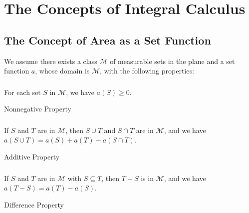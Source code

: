 \documentclass{report}
\begin{document}
\chapter{The Concepts of Integral Calculus}%

\section{The Concept of Area as a Set Function}%

  We assume there exists a class $\mathscr{M}$ of measurable sets in the plane and
    a set function $a$, whose domain is $\mathscr{M}$, with the following
    properties:

\subsection{}%

  For each set $S$ in $\mathscr{M}$, we have $a(S) \geq 0$.

    {Nonnegative Property}

\subsection{}%

  If $S$ and $T$ are in $\mathscr{M}$, then $S \cup T$ and $S \cap T$ are in
    $\mathscr{M}$, and we have $a(S \cup T) = a(S) + a(T) - a(S \cap T)$.

    {Additive Property}

\subsection{}%

  If $S$ and $T$ are in $\mathscr{M}$ with $S \subseteq T$, then $T - S$ is in
    $\mathscr{M}$, and we have $a(T - S) = a(T) - a(S)$.

    {Difference Property}

\subsection{}%
\end{document}
